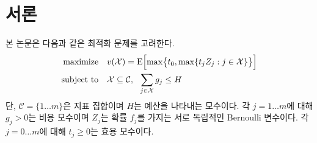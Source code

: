 \documentclass[11pt]{article} %
\newif\ifen
\theoremstyle{definition}
\newtheorem{definition}{Definition}
\theoremstyle{definition}
\newtheorem{definition}{정의}
\begin{document}
\tableofcontents



\pagebreak
\ifen \section{Introduction}  \else \section{서론} \fi
\ifen This paper considers the following optimization problem:
\else 본 논문은 다음과 같은 최적화 문제를 고려한다.\fi
\begin{align} \label{headlineproblem}
\begin{split}
\text{maximize}\quad & v(\mathcal{X}) =  \operatorname{E}\Bigl[\max\bigr\{t_0,
\max\{t_j Z_j : j \in \mathcal{X}\}\bigr\}\Bigr] \\
\text{subject to}\quad & \mathcal{X} \subseteq \mathcal{C}, ~~\sum_{j\in \mathcal{X}} g_j \leq H
\end{split}
\end{align}
\ifen Here $\mathcal{C} = \{ 1 \dots m\}$ is an index set; $H > 0$ is a budget parameter; for $j = 1 \dots m$, $g_j > 0$ is a cost parameter and $Z_j$ is a random, independent Bernoulli variable with probability $f_j$; and for $j = 0\dots m$, $t_j\geq 0$ is a utility parameter. 
\else 단,  $\mathcal{C} = \{ 1 \dots m\}$은 지표 집합이며 $H$는 예산을 나타내는 모수이다. 각 $j = 1 \dots m$에 대해 $g_j > 0$는 비용 모수이며 $Z_j$는 확률 $f_j$를 가지는 서로 독립적인 Bernoulli 변수이다. 각 $j = 0 \dots m$에 대해 $t_j\geq 0$는 효용 모수이다. \fi
\end{document}
